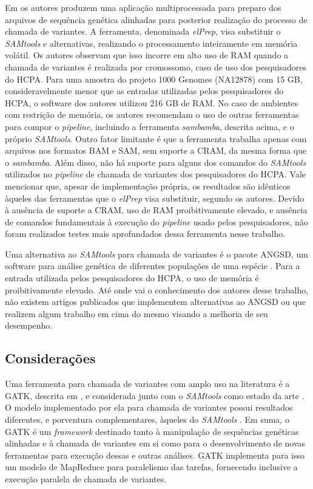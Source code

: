 \documentclass[cic,tc]{iiufrgs}
\begin{document}
Em \cite{herzeel2015elprep} os autores produzem uma aplicação
multiprocessada para preparo dos arquivos de sequência genética alinhadas para
posterior realização do processo de chamada de variantes. A ferramenta,
denominada \textit{elPrep}, visa substituir o \textit{SAMtools} e alternativas, realizando o
processamento inteiramente em memória volátil. Os autores observam que isso
incorre em alto uso de RAM quando a chamada de variantes é realizada por
cromossomo, caso de uso dos pesquisadores do HCPA. Para uma amostra do projeto
1000 Genomes (NA12878) com 15 GB, consideravelmente menor que as entradas
utilizadas pelos pesquisadores do HCPA, o software dos autores utilizou 216 GB
de RAM. No caso de ambientes com restrição de memória, os autores recomendam o
uso de outras ferramentas para compor o \textit{pipeline}, incluindo a ferramenta
\textit{sambamba}, descrita acima, e o próprio \textit{SAMtools}. Outro fator limitante é que a
ferramenta trabalha apenas com arquivos nos formatos BAM e SAM, sem suporte a
CRAM, da mesma forma que o \textit{sambamba}. Além disso, não há suporte para alguns dos
comandos do \textit{SAMtools} utilizados no \textit{pipeline} de chamada de variantes dos
pesquisadores do HCPA. Vale mencionar que, apesar de implementação própria, os
resultados são idênticos àqueles das ferramentas que o \textit{elPrep} visa substituir,
segundo os autores. Devido à ausência de suporte a CRAM, uso de RAM
proibitivamente elevado, e ausência de comandos fundamentais à execução do
\textit{pipeline} usado pelos pesquisadores, não foram realizados testes mais
aprofundados dessa ferramenta nesse trabalho.

Uma alternativa ao \textit{SAMtools} para chamada de variantes é o pacote ANGSD, um
software para análise genética de diferentes populações de uma espécie
\cite{korneliussen2014angsd}. Para a entrada utilizada pelos pesquisadores do
HCPA, o uso de memória é proibitivamente elevado. Até onde vai o conhecimento
dos autores desse trabalho, não existem artigos publicados que implementem
alternativas ao ANGSD ou que realizem algum trabalho em cima do mesmo visando a
melhoria de seu desempenho.

\subsection{Considerações}
\label{sec:alt}

Uma ferramenta para chamada de variantes com amplo uso na literatura
\cite{de2017gatk} é a GATK, descrita em \cite{mckenna2010genome}, e considerada
junto com o \textit{SAMtools} como estado da
arte \cite{yao2020evaluation} \cite{poplin2018universal}. O modelo implementado
por ela para chamada de variantes possui resultados diferentes, e porventura
complementares, àqueles do
\textit{SAMtools} \cite{gezsi2015variantmetacaller} \cite{hwang2015systematic}. Em suma, o
GATK é um \textit{framework} destinado tanto à manipulação de sequências genéticas
alinhadas e à chamada de variantes em si como para o desenvolvimento de novas
ferramentas para execução dessas e outras análises. GATK implementa para isso
um modelo de MapReduce para paralelismo das tarefas, fornecendo inclusive a
execução paralela de chamada de variantes.
\end{document}
